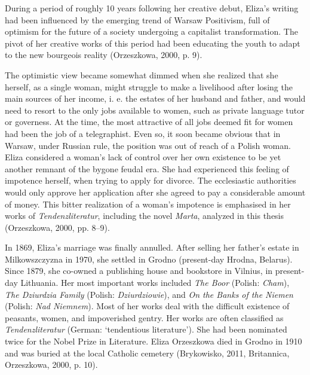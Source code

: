 During a period of roughly 10 years following
her creative debut, Eliza's writing had been influenced by the emerging trend of Warsaw Positivism, full of optimism for the future of a society undergoing a capitalist transformation.
The pivot of her creative works of this period had been educating the youth to adapt to the new bourgeois reality 
(Orzeszkowa, 2000, p. 9).

The optimistic view became somewhat dimmed when she realized that she herself, as a single woman, might struggle to make a livelihood after losing the main sources of her income, i. e. the estates of her husband and father, and would need to resort to the only jobs available to women, such as private language tutor or governess.
At the time, the most attractive of all jobs deemed fit for women had been the job of a telegraphist.
Even so, it soon became obvious that in Warsaw, under Russian rule, the position was out of reach of a Polish woman.
Eliza considered a woman's lack of control over her own existence to be yet another remnant of the bygone feudal era.
She had experienced this feeling of impotence herself, when trying to apply for divorce.
The ecclesiastic authorities would only approve her application after she agreed to pay a considerable amount of money.
This bitter realization of a woman's impotence is emphasised in her works of \textit{Tendenzliteratur}, including the novel \textit{Marta}, analyzed in this thesis
(Orzeszkowa, 2000, pp. 8--9).

In 1869, Eliza's marriage was finally annulled.
After selling her father's estate in Milkowszczyzna in 1970, she settled in Grodno (present-day Hrodna, Belarus).
Since 1879, she co-owned a publishing house and bookstore in Vilnius, in present-day Lithuania.
Her most important works included \textit{The Boor} (Polish: \textit{Cham}), \textit{The Dziurdzia Family} (Polish: \textit{Dziurdziowie}), and \textit{On the Banks of the Niemen} (Polish: \textit{Nad Niemnem}).
Most of her works deal with the difficult existence of peasants, women, and impoverished gentry.
Her works are often classified as \textit{Tendenzliteratur} (German: `tendentious literature').
She had been nominated twice for the Nobel Prize in Literature.
Eliza Orzeszkowa died in Grodno in 1910 and was buried at the local Catholic cemetery
(Brykowisko, 2011, Britannica, Orzeszkowa, 2000, p. 10).

